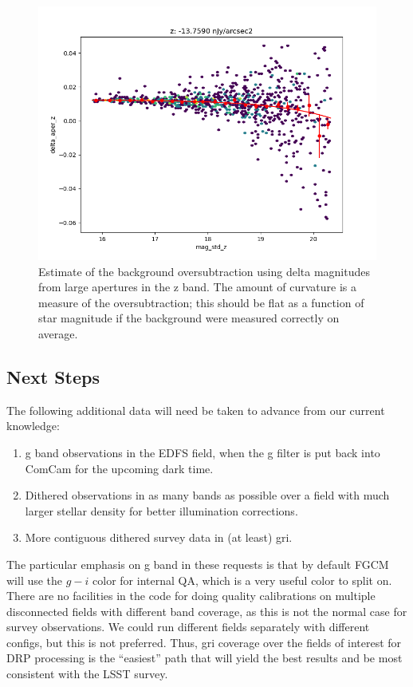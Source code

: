 \begin{figure}
  \includegraphics{photometric_calibration_figures/background_oversubtraction_z.png}
  \caption{Estimate of the background oversubtraction using delta magnitudes
    from large apertures in the z band.  The amount of curvature is a measure
    of the oversubtraction; this should be flat as a function of star magnitude
    if the background were measured correctly on average.}
\end{figure}

\subsection{Next Steps}

The following additional data will need be taken to advance from our current
knowledge:

\begin{enumerate}
  \item{g band observations in the EDFS field, when the g filter is put back
    into ComCam for the upcoming dark time.}
  \item{Dithered observations in as many bands as possible over a field with
    much larger stellar density for better illumination corrections.}
  \item{More contiguous dithered survey data in (at least) gri.}
\end{enumerate}

The particular emphasis on g band in these requests is that by default FGCM
will use the $g-i$ color for internal QA, which is a very useful color to split
on.  There are no facilities in the code for doing quality calibrations on
multiple disconnected fields with different band coverage, as this is not the
normal case for survey observations.  We could run different fields separately
with different configs, but this is not preferred.  Thus, gri coverage over the
fields of interest for DRP processing is the ``easiest'' path that will yield
the best results and be most consistent with the LSST survey.
